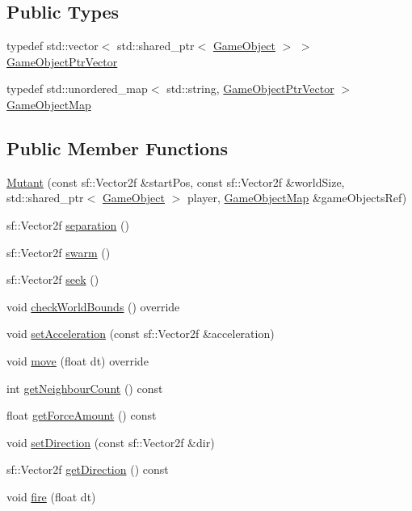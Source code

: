 \subsection*{Public Types}
\begin{DoxyCompactItemize}
\item 
typedef std\+::vector$<$ std\+::shared\+\_\+ptr$<$ \hyperlink{class_game_object}{Game\+Object} $>$ $>$ \hyperlink{class_mutant_a3fb0c08b707c995a0af286a938556169}{Game\+Object\+Ptr\+Vector}
\item 
typedef std\+::unordered\+\_\+map$<$ std\+::string, \hyperlink{class_mutant_a3fb0c08b707c995a0af286a938556169}{Game\+Object\+Ptr\+Vector} $>$ \hyperlink{class_mutant_a21ecadaee40ad4871af74ef606913db1}{Game\+Object\+Map}
\end{DoxyCompactItemize}
\subsection*{Public Member Functions}
\begin{DoxyCompactItemize}
\item 
\hyperlink{class_mutant_ae11d8a5d375b8b469a1125c5f3db059d}{Mutant} (const sf\+::\+Vector2f \&start\+Pos, const sf\+::\+Vector2f \&world\+Size, std\+::shared\+\_\+ptr$<$ \hyperlink{class_game_object}{Game\+Object} $>$ player, \hyperlink{class_mutant_a21ecadaee40ad4871af74ef606913db1}{Game\+Object\+Map} \&game\+Objects\+Ref)
\item 
sf\+::\+Vector2f \hyperlink{class_mutant_a0ea8c6678568932e57054f13c00d12d9}{separation} ()
\item 
sf\+::\+Vector2f \hyperlink{class_mutant_a03a015517d346506a2d994e3867b6228}{swarm} ()
\item 
sf\+::\+Vector2f \hyperlink{class_mutant_a5cdfb629154531e8f010930b072e14cc}{seek} ()
\item 
void \hyperlink{class_mutant_af5b703545939ef9295ecbe2762947995}{check\+World\+Bounds} () override
\item 
void \hyperlink{class_mutant_a307fa4d660b49702927e18d2dc316376}{set\+Acceleration} (const sf\+::\+Vector2f \&acceleration)
\item 
void \hyperlink{class_mutant_a5f5208a68bebe2cd3773f771a18e2992}{move} (float dt) override
\item 
int \hyperlink{class_mutant_aeca389c4c77ef86f9a41dd9e431abe50}{get\+Neighbour\+Count} () const
\item 
float \hyperlink{class_mutant_a308e103233480f0f7cd626cffc90d833}{get\+Force\+Amount} () const
\item 
void \hyperlink{class_mutant_ac404012989fab1737c145a09f37c69c3}{set\+Direction} (const sf\+::\+Vector2f \&dir)
\item 
sf\+::\+Vector2f \hyperlink{class_mutant_a9b3db53e81b2736b2390375b7a0aba2e}{get\+Direction} () const
\item 
void \hyperlink{class_mutant_a64b25d92b0d694889047b71e3e501689}{fire} (float dt)
\end{DoxyCompactItemize}
